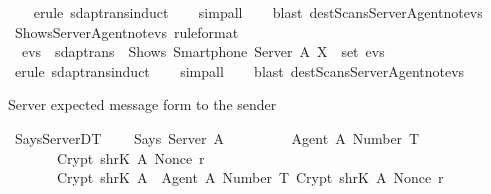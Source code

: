 \begin{isabellebody}
  \isadelimproof
  \isanewline
  \ \ %
  \endisadelimproof
  \isatagproof
  \isamarkupfalse%
  \ {\isacharparenleft}erule\ sdaptrans{\isachardot}induct{\isacharparenright}\isanewline
  \ \ \isamarkupfalse%
  \ {\isacharparenleft}simp{\isacharunderscore}all{\isacharparenright}\isanewline
  \ \ \isamarkupfalse%
  \ {\isacharparenleft}blast\ dest{\isacharcolon}Scans{\isacharunderscore}Server{\isacharunderscore}Agent{\isacharunderscore}not{\isacharunderscore}evs{\isacharparenright}{\isacharplus}\isanewline
  \isamarkupfalse%
  \endisatagproof
  {\isafoldproof}%
  \isadelimproof
  \isanewline
  \endisadelimproof
  \isanewline
  \isamarkupfalse%
  \ Shows{\isacharunderscore}Server{\isacharunderscore}Agent{\isacharunderscore}not{\isacharunderscore}evs\ {\isacharbrackleft}rule{\isacharunderscore}format{\isacharbrackright}{\isacharcolon}\isanewline
  \ \ {\isachardoublequoteopen}evs\ {\isasymin}\ sdaptrans\ {\isasymLongrightarrow}\ Shows\ {\isacharparenleft}Smartphone\ Server{\isacharparenright}\ A\ X\ {\isasymnotin}\ set\ evs{\isachardoublequoteclose}\isanewline
  \isadelimproof
  \isanewline
  \ \ %
  \endisadelimproof
  \isatagproof
  \isamarkupfalse%
  \ {\isacharparenleft}erule\ sdaptrans{\isachardot}induct{\isacharparenright}\isanewline
  \ \ \isamarkupfalse%
  \ {\isacharparenleft}simp{\isacharunderscore}all{\isacharparenright}\isanewline
  \ \ \isamarkupfalse%
  \ {\isacharparenleft}blast\ dest{\isacharcolon}Scans{\isacharunderscore}Server{\isacharunderscore}Agent{\isacharunderscore}not{\isacharunderscore}evs{\isacharparenright}{\isacharplus}\isanewline
  \isamarkupfalse%
  \endisatagproof
  {\isafoldproof}%
  \isadelimproof
  \endisadelimproof
  \begin{isamarkuptext}%
  Server expected message form to the sender%
  \end{isamarkuptext}\isamarkuptrue%
  \isamarkupfalse%
  \ Says{\isacharunderscore}Server{\isacharunderscore}DT{}\ {\isacharcolon}\isanewline
  \ \ {\isachardoublequoteopen}{\isasymlbrakk}\ Says\ Server\ A\ {\isasymlbrace}\ \isanewline
  \ \ \ \ \ \ \ {\isasymlbrace}Agent\ A{\isacharcomma}\ Number\ T{\isasymrbrace}{\isacharcomma}\ \isanewline
  \ \ \ \ \ \ \ Crypt\ {\isacharparenleft}shrK\ A{\isacharparenright}\ {\isacharparenleft}Nonce\ r{\isacharparenright}{\isacharcomma}\ \isanewline
  \ \ \ \ \ \ \ Crypt\ {\isacharparenleft}shrK\ A{\isacharparenright}\ {\isasymlbrace}\ {\isasymlbrace}Agent\ A{\isacharcomma}\ Number\ T{\isasymrbrace}{\isacharcomma}\ Crypt\ {\isacharparenleft}shrK\ A{\isacharparenright}\ {\isacharparenleft}Nonce\ r{\isacharparenright}\ {\isasymrbrace}\ \isanewline

\end{isabellebody}
